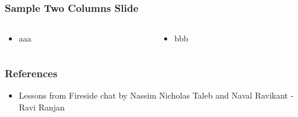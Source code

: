 \begin{frame}[fragile]\frametitle{Sample Two Columns Slide}
\begin{columns}
    \begin{column}[T]{0.6\linewidth}
      \begin{itemize}
		\item aaa
	  \end{itemize}

    \end{column}
    \begin{column}[T]{0.4\linewidth}
      \begin{itemize}
		\item bbb
	  \end{itemize}
    \end{column}
  \end{columns}
\end{frame}

\begin{frame}[fragile]\frametitle{References}
\begin{itemize}
\item Lessons from Fireside chat by Nassim Nicholas Taleb and Naval Ravikant
- Ravi Ranjan
\end{itemize}
\end{frame}